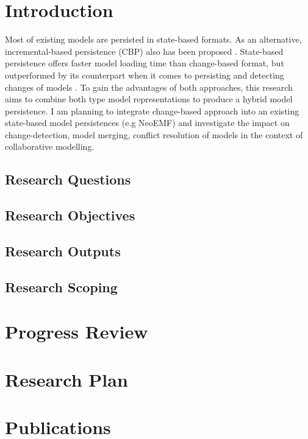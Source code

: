 \documentclass[12pt, a4paper]{report} \usepackage[titletoc]{appendix}
\begin{document}
\tableofcontents
{}

\listoffigures
\newpage
 
\listoftables
\newpage

\lstlistoflistings
\newpage

\chapter{Introduction}
\label{sec:introduction}
Most of existing models are persisted in state-based formats. As an alternative, incremental-based persistence (CBP) also has been proposed \cite{koegel2010emfstore,yohannis2017turning}. State-based persistence offers faster model loading time than change-based format, but outperformed by its counterpart when it comes to persisting and detecting changes of models \cite{yohannis2017turning}. To gain the advantages of both approaches, this research aims to combine both type model representations to produce a hybrid model persistence. I am planning to integrate change-based approach into an existing state-based model persistences (e.g NeoEMF) and investigate the impact on change-detection, model merging, conflict resolution of models in the context of collaborative modelling.

\section{Research Questions}
\label{sec:research_questions}

\section{Research Objectives}
\label{sec:research_objectives}

\section{Research Outputs}
\label{sec:research_outputs}

\section{Research Scoping}
\label{sec:eesearch_scoping}

\chapter{Progress Review}
\label{ch:progress_review}

\chapter{Research Plan}
\label{ch:research_plan}



\chapter{Publications}
\label{ch:publications}








\end{document}
